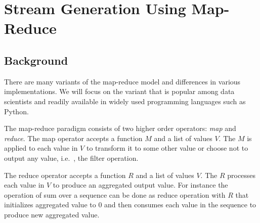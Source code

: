 \documentclass[sigchi]{acmart} %
\begin{document}

\section{Stream Generation Using Map-Reduce}
\subsection{Background}
There are many variants of the map-reduce model\cite{Afrati:2011:MER:1951365.1951367} and differences in various implementations. We will focus on the variant that is popular among data scientists and readily available in widely used programming languages such as Python.

The map-reduce paradigm consists of two higher order operators: \emph{map} and \emph{reduce}. The map operator accepts a function $M$ and a list of values $V$. The $M$ is applied to each value in $V$ to transform it to some other value or choose not to output any value, i.e.\ , the filter operation.

The reduce operator accepts a function $R$ and a list of values $V$. The $R$ processes each value in $V$ to produce an aggregated output value. For instance the operation of sum over a sequence can be done as reduce operation with $R$ that initializes aggregated value to $0$ and then consumes each value in the sequence to produce new aggregated value.
\end{document}

